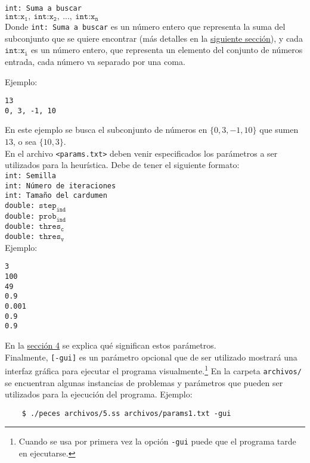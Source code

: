 \documentclass[12pt]{article}
\begin{document}
\texttt{int: Suma a buscar} \\
$\texttt{int:x}_{\texttt{1}},\ \texttt{int:x}_{\texttt{2}},\ ...,\ \texttt{int:x}_{\texttt{n}}$ \\

Donde \texttt{int: Suma a buscar} es un número entero que representa la suma del subconjunto que se quiere encontrar (más detalles en la \hyperref[sec:ss]{siguiente sección}), y cada $\texttt{int:x}_{\texttt{i}}$ es un número entero, que representa un elemento del conjunto de números entrada, cada número va separado por una coma.

\newpage

Ejemplo:
\begin{verbatim}
13
0, 3, -1, 10
\end{verbatim}
En este ejemplo se busca el subconjunto de números en $\{0, 3, -1, 10\}$ que sumen $13$, o sea $\{10, 3\}$. \\

En el archivo \texttt{<params.txt>} deben venir especificados los parámetros a ser utilizados para la heurística. Debe de tener el siguiente formato: \\

\texttt{int: Semilla} \\
\texttt{int: Número de iteraciones} \\
\texttt{int: Tamaño del cardumen} \\
\texttt{double: $\texttt{step}_{\texttt{ind}}$} \\
\texttt{double: $\texttt{prob}_{\texttt{ind}}$} \\
\texttt{double: $\texttt{thres}_{\texttt{c}}$} \\
\texttt{double: $\texttt{thres}_{\texttt{v}}$} \\

Ejemplo:
\begin{verbatim}
3
100
49
0.9
0.001
0.9
0.9
\end{verbatim}

En la \hyperref[sec:bfss]{sección 4} se explica qué significan estos parámetros. \\

Finalmente, \texttt{[-gui]} es un parámetro opcional que de ser utilizado mostrará una interfaz gráfica para ejecutar el programa visualmente.\footnote{Cuando se usa por primera vez la opción \texttt{-gui} puede que el programa tarde en ejecutarse.} En la carpeta \texttt{archivos/} se encuentran algunas instancias de problemas y parámetros que pueden ser utilizados para la ejecución del programa. Ejemplo:
\begin{verbatim}
    $ ./peces archivos/5.ss archivos/params1.txt -gui
\end{verbatim}
\end{document}
